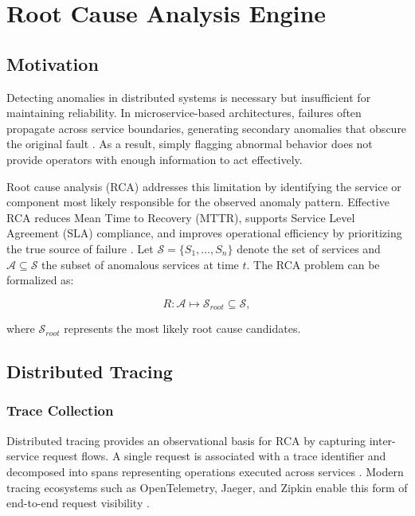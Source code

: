 \chapter{Root Cause Analysis Engine}
\label{ch:root_cause_analysis}

\section{Motivation}
\label{sec:rca_motivation}

Detecting anomalies in distributed systems is necessary but insufficient for 
maintaining reliability. In microservice-based architectures, failures often 
propagate across service boundaries, generating secondary anomalies that obscure 
the original fault \cite{munoz2017impact, zhang2019tracing}. As a result, simply 
flagging abnormal behavior does not provide operators with enough information to 
act effectively.

Root cause analysis (RCA) addresses this limitation by identifying the service or 
component most likely responsible for the observed anomaly pattern. Effective RCA 
reduces Mean Time to Recovery (MTTR), supports Service Level Agreement (SLA) 
compliance, and improves operational efficiency by prioritizing the true source 
of failure \cite{fu2020root}. Let $\mathcal{S} = \{S_1, \dots, S_n\}$ denote the 
set of services and $\mathcal{A} \subseteq \mathcal{S}$ the subset of anomalous 
services at time $t$. The RCA problem can be formalized as:

\[
R: \mathcal{A} \mapsto \mathcal{S}_{root} \subseteq \mathcal{S},
\]

where $\mathcal{S}_{root}$ represents the most likely root cause candidates.

\section{Distributed Tracing}
\label{sec:rca_tracing}

\subsection{Trace Collection}
\label{subsec:rca_trace_collection}

Distributed tracing provides an observational basis for RCA by capturing 
inter-service request flows. A single request is associated with a trace 
identifier and decomposed into spans representing operations executed across 
services \cite{sigelman2010dapper}. Modern tracing ecosystems such as 
OpenTelemetry, Jaeger, and Zipkin enable this form of end-to-end request 
visibility \cite{opentelemetry2023, jaeger2024, zipkin2024}.

